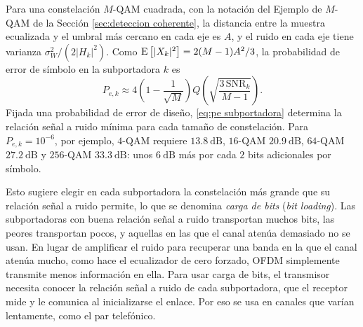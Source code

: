 Para una constelación $M$-QAM cuadrada, con la notación del Ejemplo de $M$-QAM de la Sección \ref{sec:deteccion coherente}, la distancia entre la muestra ecualizada y el umbral más cercano en cada eje es $A$, y el ruido en cada eje tiene varianza $\sigma_W^2/(2|H_k|^2)$. Como $\mathrm{E}\left[|X_k|^2\right]=2(M-1)A^2/3$, la probabilidad de error de símbolo en la subportadora $k$ es
\begin{equation}\label{eq:pe subportadora}
    P_{e,k} \approx 4\left(1-\frac{1}{\sqrt M}\right) Q\left(\sqrt{\frac{3\,\mathrm{SNR}_k}{M-1}}\right).
\end{equation}
Fijada una probabilidad de error de diseño, \eqref{eq:pe subportadora} determina la relación señal a ruido mínima para cada tamaño de constelación. Para $P_{e,k}=10^{-6}$, por ejemplo, $4$-QAM requiere $13.8\ \unit{\deci\bel}$, $16$-QAM $20.9\ \unit{\deci\bel}$, $64$-QAM $27.2\ \unit{\deci\bel}$ y $256$-QAM $33.3\ \unit{\deci\bel}$: unos $6\ \unit{\deci\bel}$ más por cada $2$ bits adicionales por símbolo.

Esto sugiere elegir en cada subportadora la constelación más grande que su relación señal a ruido permite, lo que se denomina \emph{carga de bits} (\emph{bit loading}). Las subportadoras con buena relación señal a ruido transportan muchos bits, las peores transportan pocos, y aquellas en las que el canal atenúa demasiado no se usan. En lugar de amplificar el ruido para recuperar una banda en la que el canal atenúa mucho, como hace el ecualizador de cero forzado, OFDM simplemente transmite menos información en ella. Para usar carga de bits, el transmisor necesita conocer la relación señal a ruido de cada subportadora, que el receptor mide y le comunica al inicializarse el enlace. Por eso se usa en canales que varían lentamente, como el par telefónico.

